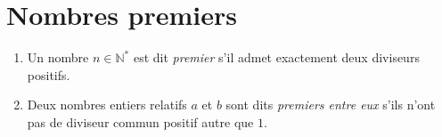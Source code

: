       \section{Nombres premiers}
            \begin{defi}
                  \begin{enumerate}
                        \item Un nombre $n\in\mathbb{N}^*$ est dit \emph{premier} 
                              s'il admet exactement deux diviseurs positifs.
                        \item Deux nombres entiers relatifs $a$ et $b$ sont dits \emph{premiers entre eux} s'ils
                              n'ont pas de diviseur commun positif autre que $1$.
                  \end{enumerate}
            \end{defi}
